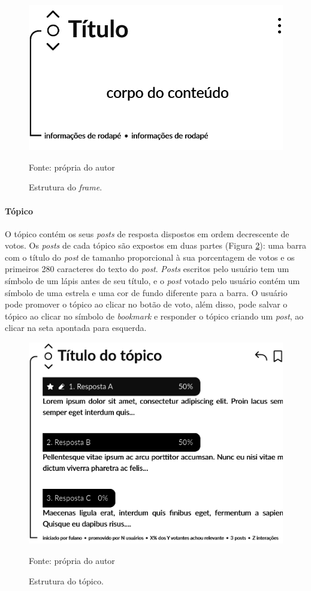 \begin{figure}[hbt!]
\centering
\includegraphics[width=0.5\linewidth]{imagens/structure/frame.png}
\caption{Estrutura do \textit{frame}.}
Fonte: própria do autor
\label{fig:frame}
\end{figure}


\paragraph{Tópico}

O tópico contém os seus \textit{posts} de resposta dispostos em ordem decrescente de votos. Os \textit{posts} de cada tópico são expostos em duas partes (Figura \ref{fig:topic}): uma barra com o título do \textit{post} de tamanho proporcional à sua porcentagem de votos e os primeiros 280 caracteres do texto do \textit{post}. \textit{Posts} escritos pelo usuário tem um símbolo de um lápis antes de seu título, e o \textit{post} votado pelo usuário contém um símbolo de uma estrela e uma cor de fundo diferente para a barra. O usuário pode promover o tópico ao clicar no botão de voto, além disso, pode salvar o tópico ao clicar no símbolo de \textit{bookmark} e responder o tópico criando um \textit{post}, ao clicar na seta apontada para esquerda.

\begin{figure}[hbt!]
\centering
\includegraphics[width=0.7\linewidth]{imagens/structure/topic.png}
\caption{Estrutura do tópico.}
Fonte: própria do autor
\label{fig:topic}
\end{figure}



